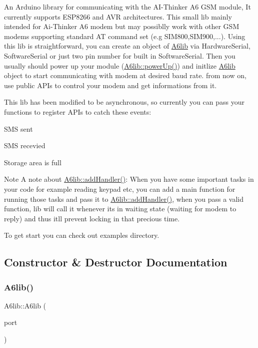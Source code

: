 An Arduino library for communicating with the A\+I-\/\+Thinker A6 G\+SM module, It currently supports E\+S\+P8266 and A\+VR architectures. This small lib mainly intended for Ai-\/\+Thinker A6 modem but may possiblly work with other G\+SM modems supporting standard AT command set (e.\+g S\+I\+M800,S\+I\+M900,...). Using this lib is straightforward, you can create an object of \mbox{\hyperlink{class_a6lib}{A6lib}} via Hardware\+Serial, Software\+Serial or just two pin number for built in Software\+Serial. Then you usually should power up your module (\mbox{\hyperlink{class_a6lib_add46e8926e5809cc7e33a7ad2817fcc5}{A6lib\+::power\+Up()}}) and initlize \mbox{\hyperlink{class_a6lib}{A6lib}} object to start communicating with modem at desired baud rate. from now on, use public A\+P\+Is to control your modem and get informations from it.

This lib has been modified to be asynchronous, so currently you can pass your functions to register A\+P\+Is to catch these events\+:
\begin{DoxyEnumerate}
\item S\+MS sent
\item S\+MS recevied
\item Storage area is full
\end{DoxyEnumerate}

\begin{DoxyNote}{Note}
A note about \mbox{\hyperlink{class_a6lib_ab9580c0720252ad9e2d6b67683e3e88f}{A6lib\+::add\+Handler()}}\+: When you have some important tasks in your code for example reading keypad etc, you can add a main function for running those tasks and pass it to \mbox{\hyperlink{class_a6lib_ab9580c0720252ad9e2d6b67683e3e88f}{A6lib\+::add\+Handler()}}, when you pass a valid function, lib will call it whenever it\textquotesingle{}s in waiting state (waiting for modem to reply) and thus it\textquotesingle{}ll prevent locking in that precious time.
\end{DoxyNote}
To get start you can check out examples directory. 

\subsection{Constructor \& Destructor Documentation}
\mbox{\label{class_a6lib_a5cbcf78590cf824bfaa16b181b6ac4a1}} 
\subsubsection{\texorpdfstring{A6lib()}{A6lib()}\hspace{0.1cm}{\footnotesize\ttfamily [1/3]}}
{\footnotesize\ttfamily A6lib\+::\+A6lib (\begin{DoxyParamCaption}\item[{Hardware\+Serial $\ast$}]{port }\end{DoxyParamCaption})}


